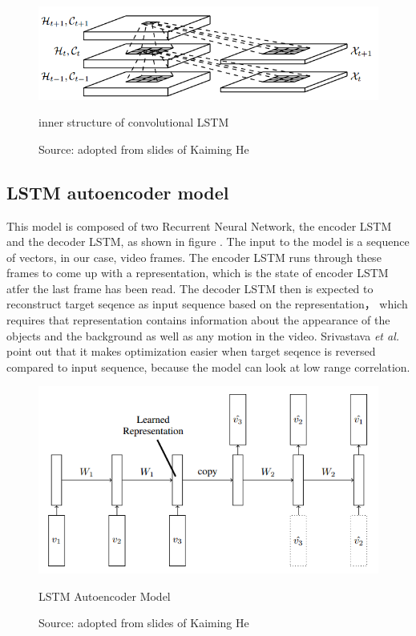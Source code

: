 \documentclass[twoside,a4paper,article]{combine}
\begin{document}
\begin{figure}[ht!]
    \includegraphics[width=\linewidth]{convlstm}
    \caption{inner structure of convolutional LSTM}
    \caption*{Source: adopted from slides of Kaiming He}
    \label{fig:convlstm}
\end{figure}

\subsection{LSTM autoencoder model}
This model is composed of two Recurrent Neural Network, the encoder LSTM and the decoder LSTM, as shown in figure \cite{fig:autoencoder}.
The input to the model is a sequence of vectors, in our case, video frames. The encoder LSTM runs through these frames to come up with a
representation, which is the state of encoder LSTM atfer the last frame has been read. The decoder LSTM then is expected to reconstruct
target seqence as input sequence based on the representation， which requires that representation contains information about the
appearance of the objects and the background as well as any motion in the video. Srivastava \emph{et al.} point out that it makes
optimization easier when target seqence is reversed compared to input sequence, because the model can look at low range correlation. 

\begin{figure}[ht!]
    \includegraphics[width=\linewidth]{autoencoder}
    \caption{LSTM Autoencoder Model}
    \caption*{Source: adopted from slides of Kaiming He}
    \label{fig:autoencoder}
\end{figure}
\end{document}
